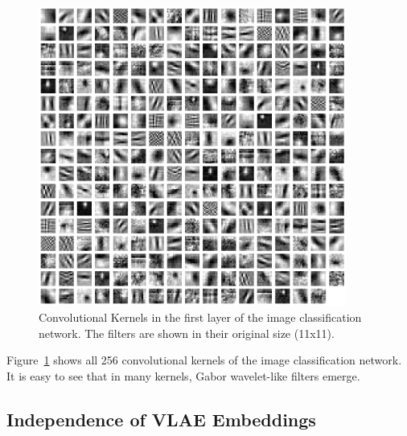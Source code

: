 \documentclass[11pt]{article}
\begin{document}
    \begin{figure}
        \centering
        \includegraphics[width=0.9\textwidth]{images/alexnet_classification_l1_kernels.png}
        \caption[Image classification - Layer 1 Kernels]{Convolutional Kernels in the first layer of the image classification network. The filters are shown in their original size (11x11).}
        \label{fig:classification_layer1_kernels}
    \end{figure}

    Figure~\ref{fig:classification_layer1_kernels} shows all 256 convolutional kernels of the image classification network.
    It is easy to see that in many kernels, Gabor wavelet-like filters emerge.

    \subsection{Independence of VLAE Embeddings}\label{subsec:independence-of-vlae-embeddings}
\end{document}
